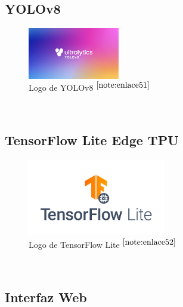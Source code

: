 \setcounter{footnote}{50} %

\subsection{YOLOv8}


\begin{figure} [h!]
	\begin{center}
		\includegraphics[width=4cm]{figs/yolov8.png}
	\end{center}
	\caption{Logo de YOLOv8 $^{\ref{note:enlace51}}$} 
	\label{fig:yolov8}
\end{figure}\

\setcounter{footnote}{51} %


\subsection{TensorFlow Lite Edge TPU}

\begin{figure} [h!]
	\begin{center}
		\includegraphics[width=6cm]{figs/tflite.png}
	\end{center}
	\caption{Logo de TensorFlow Lite $^{\ref{note:enlace52}}$} 
	\label{fig:tflite}
\end{figure}\

\setcounter{footnote}{52} %


\subsection{Interfaz Web}

